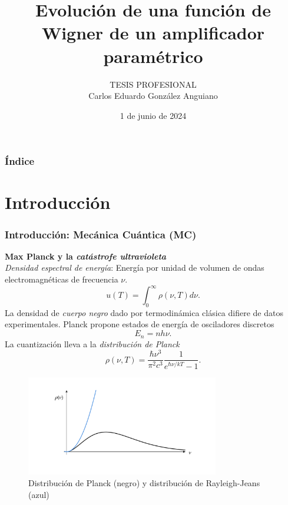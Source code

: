 \documentclass[xcolor=dvipsnames,slidestop,compress,mathserif, 11pt]{beamer}
\title[Tesis profesional]{Evoluci\'on de una funci\'on de Wigner de un amplificador param\'etrico}
\author{TESIS PROFESIONAL\\
Carlos Eduardo González Anguiano}
\institute{Departamento de Física ESFM-IPN}
\date{1 de junio de 2024}
\begin{document}
\maketitle


\begin{frame}
	\frametitle{Índice}
	\tableofcontents[pausesections]
\end{frame}

\section{Introducción}

\begin{frame}[c]
	\frametitle{Introducción: Mecánica Cuántica (MC)}
	\textbf{Max Planck y la \textit{catástrofe ultravioleta}}\\
	\justifying \textit{Densidad espectral de energía}: Energía por unidad de volumen de ondas electromagnéticas de frecuencia $\nu$.
	\begin{equation}
		u(T)=\int_{0}^{\infty}\rho(\nu, T)d\nu.
	\end{equation}
	\justifying La densidad de \textit{cuerpo negro} dado por termodinámica clásica difiere de datos experimentales.
	Planck propone estados de energía de osciladores discretos
	\begin{equation}
		E_n = nh\nu.
	\end{equation}
	\justifying La cuantización lleva a la \textit{distribución de Planck}
	\begin{equation}
		\rho(\nu, T) = \frac{\hbar \nu^3}{\pi^2 c^3} \frac{1}{e^{\hbar\nu/kT}-1}.
	\end{equation}
\end{frame}

\begin{frame}
	\begin{figure}[h]
		\centering
		\includegraphics[width=0.75\textwidth]{images/planck-distribution.png}
		\caption{Distribución de Planck (negro) y distribución de Rayleigh-Jeans (azul)}
		\label{fig:dist-planck}
	\end{figure}
\end{frame}
\end{document}
